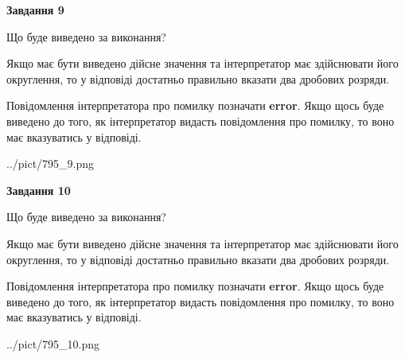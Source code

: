 \documentclass[12pt, ukrainian]{article}
\begin{document}
{\begin {Large}
{\begin {center}\textbf{Завдання 9}\end {center}}\par
Що буде виведено за виконання? \par

Якщо має бути виведено дійсне значення та інтерпретатор має здійснювати його округлення, 
то у відповіді достатньо правильно вказати два дробових розряди.

Повідомлення інтерпретатора про помилку позначати \textbf{error}.
Якщо щось буде виведено до того, як інтерпретатор видасть повідомлення про помилку, 
то воно має вказуватись у відповіді. \par

\begin{center}
	{../pict/795_9.png}
\end{center}
\newpage

{\begin {center}\textbf{Завдання 10}\end {center}}\par
Що буде виведено за виконання? \par

Якщо має бути виведено дійсне значення та інтерпретатор має здійснювати його округлення, 
то у відповіді достатньо правильно вказати два дробових розряди.

Повідомлення інтерпретатора про помилку позначати \textbf{error}.
Якщо щось буде виведено до того, як інтерпретатор видасть повідомлення про помилку, 
то воно має вказуватись у відповіді. \par

\begin{center}
	{../pict/795_10.png}
\end{center}
\newpage

\end {Large}}
\end{document}
